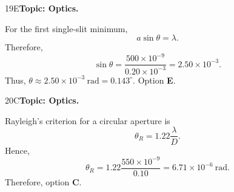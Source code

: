 \documentclass[10pt,a4paper]{physicsquiz}
\begin{document}
\begin{workedsolution}{19}{E}\textbf{Topic: Optics.}\par For the first single-slit minimum,
  \[
    a\sin\theta=\lambda.
  \]
  Therefore,
  \[
    \sin\theta=\frac{500\times10^{-9}}{0.20\times10^{-3}}=2.50\times10^{-3}.
  \]
  Thus, \(\theta\approx2.50\times10^{-3}\ \mathrm{rad}=0.143^\circ\). Option \textbf{E}.\end{workedsolution}
\begin{workedsolution}{20}{C}\textbf{Topic: Optics.}\par Rayleigh's criterion for a circular aperture is
  \[
    \theta_R=1.22\frac{\lambda}{D}.
  \]
  Hence,
  \[
    \theta_R=1.22\frac{550\times10^{-9}}{0.10}
    =6.71\times10^{-6}\ \mathrm{rad}.
  \]
  Therefore, option \textbf{C}.\end{workedsolution}
\end{document}
